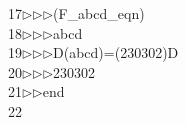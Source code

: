 \begin{tabbing}
17\>$\triangleright$\>$\triangleright$\>$\triangleright$\>(F\_abcd\_eqn)\ \\[0pt]
18\>$\triangleright$\>$\triangleright$\>$\triangleright$\>abcd\ \\[0pt]
19\>$\triangleright$\>$\triangleright$\>$\triangleright$\>D(abcd)=(230302)D\ \\[0pt]
20\>$\triangleright$\>$\triangleright$\>$\triangleright$\>230302\ \\[0pt]
21\>$\triangleright$\>$\triangleright$\>end\\[0pt]
22\>\end{tabbing}
